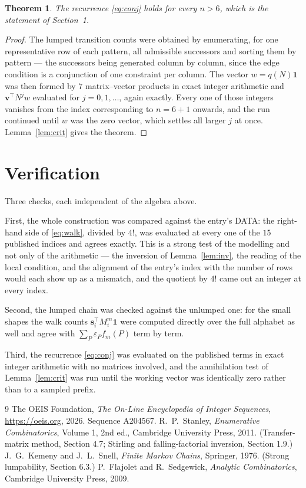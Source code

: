 \documentclass[11pt,a4paper]{article}
\theoremstyle{plain}
\newtheorem{theorem}{Theorem}
\theoremstyle{definition}
\begin{document}
\begin{theorem}
The recurrence \eqref{eq:conj} holds for every $n>6$, which is the statement of
Section~1.
\end{theorem}

\begin{proof}
The lumped transition counts were obtained by enumerating, for one representative row of
each pattern, all admissible successors and sorting them by pattern --- the successors being
generated column by column, since the edge condition is a conjunction of one constraint per
column. The vector $w=q(N)\mathbf{1}$ was then formed by $7$ matrix--vector products
in exact integer arithmetic and $\mathbf{v}^{\!\top}N^{j}w$ evaluated for
$j=0,1,\dots$, again exactly. Every one of those integers vanishes from the index
corresponding to $n=6+1$ onwards, and the run continued until $w$ was the zero vector,
which settles all larger $j$ at once. Lemma~\ref{lem:crit} gives the theorem.
\end{proof}

\section{Verification}

Three checks, each independent of the algebra above.

First, the whole construction was compared against the entry's DATA: the right-hand side of
\eqref{eq:walk}, divided by $4!$, was evaluated at every one of the $15$
published indices and agrees exactly. This is a strong test of the modelling and not only of
the arithmetic --- the inversion of Lemma~\ref{lem:inv}, the reading of the local
condition, and the alignment of the entry's index with the number of rows would each
show up as a mismatch, and the quotient by $4!$ came out an integer at every index.

Second, the lumped chain was checked against the unlumped one: for the small shapes the walk
counts $\mathbf{s}_i^{\!\top}M_i^{m}\mathbf{1}$ were computed directly over the full
alphabet as well and agree with $\sum_P\varepsilon_Pf_m(P)$ term by term.

Third, the recurrence \eqref{eq:conj} was evaluated on the published terms in exact integer
arithmetic with no matrices involved, and the annihilation test of Lemma~\ref{lem:crit} was
run until the working vector was identically zero rather than to a sampled prefix.

\begin{thebibliography}{9}
 The OEIS Foundation, \emph{The On-Line Encyclopedia of Integer
Sequences}, \url{https://oeis.org}, 2026. Sequence A204567.
 R.~P.~Stanley, \emph{Enumerative Combinatorics}, Volume 1, 2nd ed.,
Cambridge University Press, 2011. (Transfer-matrix method, Section 4.7; Stirling and
falling-factorial inversion, Section 1.9.)
 J.~G.~Kemeny and J.~L.~Snell, \emph{Finite Markov Chains}, Springer,
1976. (Strong lumpability, Section 6.3.)
 P.~Flajolet and R.~Sedgewick, \emph{Analytic Combinatorics}, Cambridge
University Press, 2009.
\end{thebibliography}
\end{document}
